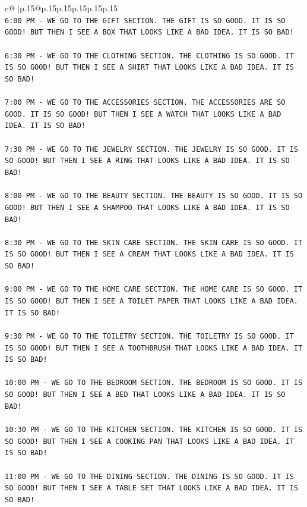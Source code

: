 \documentclass{article}
\begin{document}
{\begin{supertabular}{c@{$\;$}|p{.15\linewidth}@{}p{.15\linewidth}p{.15\linewidth}p{.15\linewidth}p{.15\linewidth}p{.15\linewidth}}
{{{\\ 
\texttt{6:00 PM {-} WE GO TO THE GIFT SECTION. THE GIFT IS SO GOOD. IT IS SO GOOD! BUT THEN I SEE A BOX THAT LOOKS LIKE A BAD IDEA. IT IS SO BAD!} \\
\\ 
\texttt{6:30 PM {-} WE GO TO THE CLOTHING SECTION. THE CLOTHING IS SO GOOD. IT IS SO GOOD! BUT THEN I SEE A SHIRT THAT LOOKS LIKE A BAD IDEA. IT IS SO BAD!} \\
\\ 
\texttt{7:00 PM {-} WE GO TO THE ACCESSORIES SECTION. THE ACCESSORIES ARE SO GOOD. IT IS SO GOOD! BUT THEN I SEE A WATCH THAT LOOKS LIKE A BAD IDEA. IT IS SO BAD!} \\
\\ 
\texttt{7:30 PM {-} WE GO TO THE JEWELRY SECTION. THE JEWELRY IS SO GOOD. IT IS SO GOOD! BUT THEN I SEE A RING THAT LOOKS LIKE A BAD IDEA. IT IS SO BAD!} \\
\\ 
\texttt{8:00 PM {-} WE GO TO THE BEAUTY SECTION. THE BEAUTY IS SO GOOD. IT IS SO GOOD! BUT THEN I SEE A SHAMPOO THAT LOOKS LIKE A BAD IDEA. IT IS SO BAD!} \\
\\ 
\texttt{8:30 PM {-} WE GO TO THE SKIN CARE SECTION. THE SKIN CARE IS SO GOOD. IT IS SO GOOD! BUT THEN I SEE A CREAM THAT LOOKS LIKE A BAD IDEA. IT IS SO BAD!} \\
\\ 
\texttt{9:00 PM {-} WE GO TO THE HOME CARE SECTION. THE HOME CARE IS SO GOOD. IT IS SO GOOD! BUT THEN I SEE A TOILET PAPER THAT LOOKS LIKE A BAD IDEA. IT IS SO BAD!} \\
\\ 
\texttt{9:30 PM {-} WE GO TO THE TOILETRY SECTION. THE TOILETRY IS SO GOOD. IT IS SO GOOD! BUT THEN I SEE A TOOTHBRUSH THAT LOOKS LIKE A BAD IDEA. IT IS SO BAD!} \\
\\ 
\texttt{10:00 PM {-} WE GO TO THE BEDROOM SECTION. THE BEDROOM IS SO GOOD. IT IS SO GOOD! BUT THEN I SEE A BED THAT LOOKS LIKE A BAD IDEA. IT IS SO BAD!} \\
\\ 
\texttt{10:30 PM {-} WE GO TO THE KITCHEN SECTION. THE KITCHEN IS SO GOOD. IT IS SO GOOD! BUT THEN I SEE A COOKING PAN THAT LOOKS LIKE A BAD IDEA. IT IS SO BAD!} \\
\\ 
\texttt{11:00 PM {-} WE GO TO THE DINING SECTION. THE DINING IS SO GOOD. IT IS SO GOOD! BUT THEN I SEE A TABLE SET THAT LOOKS LIKE A BAD IDEA. IT IS SO BAD!} \\
}}}
\end{supertabular}}
\end{document}
